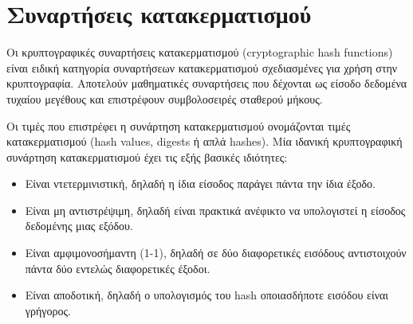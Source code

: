 \section{Συναρτήσεις κατακερματισμού} \label{section:2-1-hash-functions}

Οι κρυπτογραφικές συναρτήσεις κατακερματισμού (cryptographic hash functions) είναι ειδική κατηγορία συναρτήσεων κατακερματισμού σχεδιασμένες για χρήση στην κρυπτογραφία. Αποτελούν μαθηματικές συναρτήσεις που δέχονται ως είσοδο δεδομένα τυχαίου μεγέθους και επιστρέφουν συμβολοσειρές σταθερού μήκους.


Οι τιμές που επιστρέφει η συνάρτηση κατακερματισμού ονομάζονται τιμές κατακερματισμού (hash values, digests ή απλά hashes). Μία ιδανική κρυπτογραφική συνάρτηση κατακερματισμού έχει τις εξής βασικές ιδιότητες:

\begin{itemize}
	\item Είναι ντετερμινιστική, δηλαδή η ίδια είσοδος παράγει πάντα την ίδια έξοδο.
	\item Είναι μη αντιστρέψιμη, δηλαδή είναι πρακτικά ανέφικτο να υπολογιστεί η είσοδος δεδομένης μιας εξόδου.
	\item Είναι αμφιμονοσήμαντη (1-1), δηλαδή σε δύο διαφορετικές εισόδους αντιστοιχούν πάντα δύο εντελώς διαφορετικές έξοδοι.
	\item Είναι αποδοτική, δηλαδή ο υπολογισμός του hash οποιασδήποτε εισόδου είναι γρήγορος.
\end{itemize}

